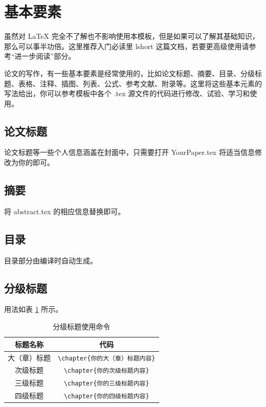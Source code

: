 \section{基本要素}
虽然对 \LaTeX{} 完全不了解也不影响使用本模板，但是如果可以了解其基础知识，那么可以事半功倍。这里推荐入门必读里 lshort 这篇文档，若要更高级使用请参考“进一步阅读”部分。

论文的写作，有一些基本要素是经常使用的，比如论文标题、摘要、目录、分级标题、表格、注释、插图、列表、公式、参考文献、附录等。这里将这些基本元素的写法给出，你可以参考模板中各个 .tex 源文件的代码进行修改、试验、学习和使用。

\subsection{论文标题}
论文标题等一些个人信息涵盖在封面中，只需要打开 YourPaper.tex 将适当信息修改为你的即可。

\subsection{摘要}
将 abstract.tex 的相应信息替换即可。

\subsection{目录}
目录部分由编译时自动生成。

\subsection{分级标题}
用法如表 \ref{tab:fjbt} 所示。
{
\begin{longtable}{cc}
	\caption{分级标题使用命令}\label{tab:fjbt}\\
	\midrule
	标题名称&	代码\\
	\hline
	大（章）标题&	\verb|\chapter{你的大（章）标题内容}|\\
	次级标题&	\verb|\chapter{你的次级标题内容}|\\
	三级标题&	\verb|\chapter{你的三级标题内容}|\\
	四级标题&	\verb|\chapter{你的四级标题内容}|\\
	\bottomrule
\end{longtable}
}

